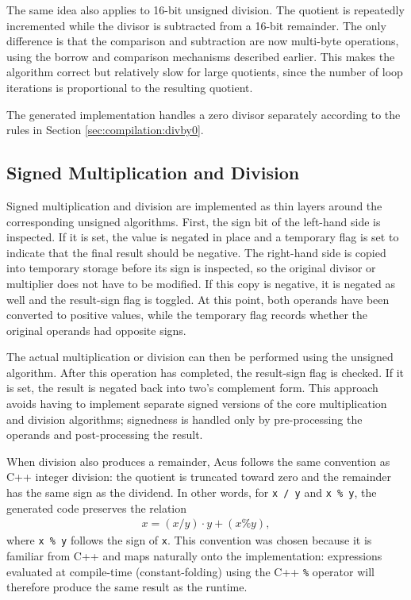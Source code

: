 The same idea also applies to 16-bit unsigned division. The quotient is repeatedly incremented while the divisor is subtracted from a 16-bit remainder. The only difference is that the comparison and subtraction are now multi-byte operations, using the borrow and comparison mechanisms described earlier. This makes the algorithm correct but relatively slow for large quotients, since the number of loop iterations is proportional to the resulting quotient.

The generated implementation handles a zero divisor separately according to the rules in Section \ref{sec:compilation:divby0}.


\subsection{Signed Multiplication and Division}
\label{sec:compilation:signedmuldiv}
Signed multiplication and division are implemented as thin layers around the corresponding unsigned algorithms. First, the sign bit of the left-hand side is inspected. If it is set, the value is negated in place and a temporary flag is set to indicate that the final result should be negative. The right-hand side is copied into temporary storage before its sign is inspected, so the original divisor or multiplier does not have to be modified. If this copy is negative, it is negated as well and the result-sign flag is toggled. At this point, both operands have been converted to positive values, while the temporary flag records whether the original operands had opposite signs.

The actual multiplication or division can then be performed using the unsigned algorithm. After this operation has completed, the result-sign flag is checked. If it is set, the result is negated back into two's complement form. This approach avoids having to implement separate signed versions of the core multiplication and division algorithms; signedness is handled only by pre-processing the operands and post-processing the result.

When division also produces a remainder, Acus follows the same convention as C++ integer division: the quotient is truncated toward zero and the remainder has the same sign as the dividend. In other words, for \texttt{x / y} and \texttt{x \% y}, the generated code preserves the relation
%
\begin{align}
  x = (x / y)\cdot y + (x\%y),
\end{align}
%
where \texttt{x \% y} follows the sign of \texttt{x}. This convention was chosen because it is familiar from C++ and maps naturally onto the implementation: expressions evaluated at compile-time (constant-folding) using the C++ \texttt{\%} operator will therefore produce the same result as the runtime.

